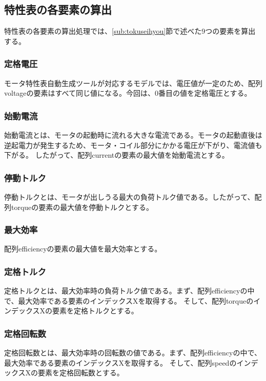 \subsection{特性表の各要素の算出}\label{sub:youso_mortoku}
特性表の各要素の算出処理では、\ref{sub:tokuseihyou}節で述べた9つの要素を算出する。



\subsubsection{定格電圧}\label{sub:sub:dennatu}
モータ特性表自動生成ツールが対応するモデルでは、電圧値が一定のため、配列voltageの要素はすべて同じ値になる。今回は、0番目の値を定格電圧とする。

\subsubsection{始動電流}\label{sub:sub:sidouden}
始動電流とは、モータの起動時に流れる大きな電流である。モータの起動直後は逆起電力が発生するため、モータ・コイル部分にかかる電圧が下がり、電流値も下がる。
したがって、配列currentの要素の最大値を始動電流とする。

\subsubsection{停動トルク}\label{sub:sub:teidoutoruku}
停動トルクとは、モータが出しうる最大の負荷トルク値である。したがって、配列torqueの要素の最大値を停動トルクとする。

\subsubsection{最大効率}\label{sub:sub:saidaikouritu}
配列efficiencyの要素の最大値を最大効率とする。

\subsubsection{定格トルク}\label{sub:sub:teikakutoruku}
定格トルクとは、最大効率時の負荷トルク値である。まず、配列efficiencyの中で、最大効率である要素のインデックスXを取得する。
そして、配列torqueのインデックスXの要素を定格トルクとする。

\subsubsection{定格回転数}\label{sub:sub:teikakukaiten}
定格回転数とは、最大効率時の回転数の値である。まず、配列efficiencyの中で、最大効率である要素のインデックスXを取得する。
そして、配列speedのインデックスXの要素を定格回転数とする。


